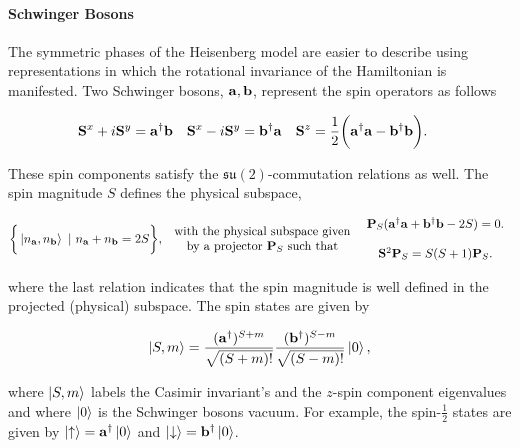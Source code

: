 \documentclass{homework}
\begin{document}
\paragraph{\textbf{Schwinger Bosons}}

The symmetric phases of the Heisenberg model are easier to describe using representations in which the rotational invariance of the Hamiltonian is manifested. Two Schwinger bosons, ${\bf a}, {\bf b}$, represent the spin operators as follows 

\begin{align}
    {\bf S}^x + i {\bf S}^y &= {\bf a}^\dagger {\bf b} & 
    {\bf S}^x - i {\bf S}^y &= {\bf b}^\dagger {\bf a} & {\bf S}^z &= \frac{1}{2} \bigg({\bf a}^\dagger {\bf a} - {\bf b}^\dagger {\bf b}\bigg).
\end{align}

These spin components satisfy the $\mathfrak{s}\mathfrak{u}(2)$-commutation relations as well. The spin magnitude $S$ defines the physical subspace, 

\begin{equation}
    \begin{split}
         \bigg\{\ket{n_{\bf a}, n_{\bf b}} \textnormal{ } | \textnormal{ } n_{\bf a} + n_{\bf b} = 2S\bigg\}, \begin{array}{c}
            \textnormal{ with the physical   subspace given }  \\
            \textnormal{ by a projector ${\bf P}_S$  such that } \\         \end{array} \begin{array}{c}
              {\bf P}_{S}({\bf a}^\dagger {\bf a} + {\bf b}^\dagger {\bf b} - 2S) = 0. \\ 
              \\
              {\bf S}^2 {\bf P}_S = S(S+1) {\bf P}_S.
         \end{array}
     \label{Schwinger_boson_projector}
    \end{split}
\end{equation}

where the last relation indicates that the spin magnitude is well defined in the projected (physical) subspace. The spin states are given by 

\begin{equation}
    \ket{S, m} = \frac{({\bf a}^\dagger)^{S+m}}{\sqrt{(S+m)!}} \frac{({\bf b}^\dagger)^{S-m}}{\sqrt{(S-m)!}} \ket{0}, 
\end{equation}

where $\ket{S,m}$ labels the Casimir invariant's and the $z$-spin component eigenvalues and where $\ket{0}$ is the Schwinger bosons vacuum. For example, the spin-$\frac{1}{2}$ states are given by $\ket{\uparrow} = {\bf a}^\dagger \ket{0}$ and $\ket{\downarrow} = {\bf b}^\dagger \ket{0}$. 
\end{document}

